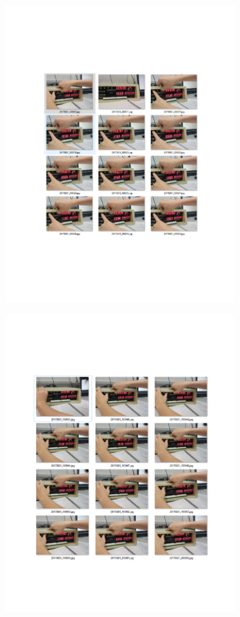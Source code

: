 \documentclass{article}
\begin{document}
					\begin{figure}[!htb]
					\begin{center}
					\includegraphics[width=0.9\textwidth]{b2}
					\end{center}\end{figure}
					\begin{figure}[!htb]
					\begin{center}
					\includegraphics[width=0.9\textwidth]{b1}
					\end{center}\end{figure}
					
\end{document}
